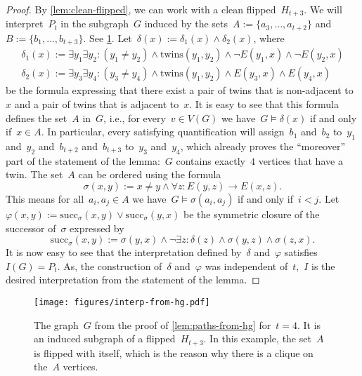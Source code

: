 \documentclass[11pt]{article}      \usepackage[margin=1in]{geometry}  \usepackage{microtype}
\theoremstyle{definition}
\renewcommand{\phi}{\varphi}
\newcommand{\twins}{\mathrm{twins}}
\begin{document}
\begin{proof}
    By \cref{lem:clean-flipped}, we can work with a clean flipped~$H_{t+3}$.
    We will interpret~$P_t$ in the subgraph~$G$ induced by the sets~$A:=\{a_3,\ldots,a_{t+2}\}$ and~$B:=\{b_1,\ldots,b_{t + 3}\}$.
    See \cref{fig:interp-from-hg}.
    Let~$\delta(x) := \delta_1(x) \wedge \delta_2(x)$, where
\begin{gather*}
        \delta_1(x) := \exists y_1 \exists y_2: (y_1 \neq y_2) \wedge \twins(y_1,y_2) \wedge \neg E(y_1,x) \wedge \neg E(y_2,x)\\
        \delta_2(x) := \exists y_3 \exists y_4: (y_3 \neq y_4) \wedge \twins(y_1,y_2) \wedge E(y_3,x) \wedge E(y_4,x) 
    \end{gather*}
    be the formula expressing that there exist a pair of twins that is non-adjacent to~$x$ and a pair of twins that is adjacent to~$x$.
    It is easy to see that this formula defines the set~$A$ in~$G$, i.e., for every~$v\in V(G)$ we have~$G\models \delta(x)$ if and only if~$x \in A$.
    In particular, every satisfying quantification will assign~$b_1$ and~$b_2$ to~$y_1$ and~$y_2$ and~$b_{t+2}$ and~$b_{t+3}$ to~$y_3$ and~$y_4$, which already proves the ``moreover'' part of the statement of the lemma:~$G$ contains exactly~$4$ vertices that have a twin.
    The set~$A$ can be ordered using the formula
    \[
        \sigma(x,y) := x \neq y \wedge \forall z: E(y,z) \rightarrow E(x,z).
    \]
    This means for all~$a_i,a_j \in A$ we have~$G \models \sigma(a_i,a_j)$ if and only if~$i < j$.
    Let~$\phi(x,y) := \mathrm{succ}_\sigma(x,y) \vee \mathrm{succ}_\sigma(y,x)$ be the symmetric closure of the successor of~$\sigma$ expressed by
    \[
        \mathrm{succ}_\sigma(x,y) := \sigma(y,x) \wedge \neg \exists z: \delta(z) \wedge \sigma(y,z) \wedge \sigma(z,x).
    \]
    It is now easy to see that the interpretation defined by~$\delta$ and~$\phi$ satisfies~$I(G)= P_t$.
    As, the construction of~$\delta$ and~$\phi$ was independent of~$t$,~$I$ is the desired interpretation from the statement of the lemma.
\end{proof}

\begin{figure}[htbp]
    \centering
    \texttt{[image: figures/interp-from-hg.pdf]}
    \caption{The graph~$G$ from the proof of \cref{lem:paths-from-hg} for~$t=4$.
    It is an induced subgraph of a flipped~$H_{t+3}$. In this example, the set~$A$ is flipped with itself, which is the reason why there is a clique on the~$A$ vertices.}
    \label{fig:interp-from-hg}
\end{figure}
\end{document}
